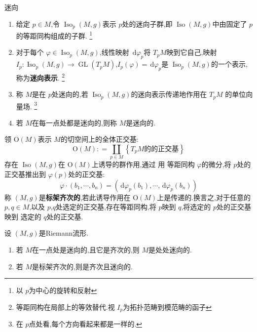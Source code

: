 \documentclass[../../几何与拓扑.tex]{subfiles}
\begin{document}
\begin{definition}{迷向}
    \begin{enumerate}
        \item 给定 \(  p \in M  \),令 \(  \operatorname{Iso} _{p}\left( M,g \right)   \)表示 \(  p  \)处的迷向子群,即 \(  \operatorname{Iso} \left( M,g \right)   \)中由固定了 \(  p  \)的等距同构组成的子群. \footnote{以 \(  p  \)为中心的旋转和反射 }
        \item 对于每个 \(   \varphi  \in \operatorname{Iso} _{p}\left( M,g \right)   \),线性映射 \(  \,\mathrm{d}  \varphi _{p}  \)将 \(  T_{p}M  \)映到它自己,映射 \(  I _{p}: \operatorname{Iso} _{p}\left( M,g \right)\to \operatorname{GL} \left( T_{p}M \right)    \),\(  I _{p}\left(  \varphi  \right)= \,\mathrm{d}  \varphi _{p}   \)是 \(  \operatorname{Iso} _{p}\left( M,g \right)   \)的一个表示,称为\textbf{迷向表示}. \footnote{等距同构在局部上的等效替代.视 \(  I _{p}  \)为拓扑范畴到模范畴的函子 }
        \item 称 \(  M  \)是在 \(  p  \)处迷向的,若 \(  \operatorname{Iso} _{p}\left( M,g \right)   \)的迷向表示传递地作用在 \(  T_{p}M  \)              的单位向量场. \footnote{在 \(  p  \)点处看,每个方向看起来都是一样的. }
        \item 若 \(  M  \)在每一点处都是迷向的,则称 \(  M  \)是迷向的.   
    \end{enumerate}
\end{definition}

\begin{definition}
    领 \(  \mathrm{O}\left( M \right)   \)表示 \(  M  \)的切空间上的全体正交基: \[
    \mathrm{O}\left( M \right): =  \coprod  _{p \in M}\left\{  T_{p}M  的\text{的正交基}\right\} 
    \]  存在 \(  \operatorname{Iso} \left( M,g \right)   \)在 \(  \mathrm{O}\left( M \right)   \)上诱导的群作用,通过 用 等距同构 \(   \varphi   \)的微分,将 \(  p  \)处的正交基推出到 \(  \varphi \left( p \right)   \)处的正交基: \[
     \varphi \cdot \left( b_1,\cdots ,b_{n} \right)= \left( \,\mathrm{d}  \varphi _{p}\left( b_1 \right),\cdots ,\,\mathrm{d}  \varphi _{p}\left( b_{n} \right)   \right)  
    \]
    称 \(  \left( M,g \right)   \)是\textbf{标架齐次的},若此诱导作用在 \(  \mathrm{O}\left( M \right)   \)上是传递的.换言之,对于任意的 \(  p,q \in M  \),以及 \(  p  \),\(  q  \)处选定的正交基,存在等距同构,将 \(  p  \)映到 \(  q  \),将选定的 \(  p  \)处的正交基映到 选定的 \(  q  \)处的正交基.              
\end{definition}

\begin{proposition}
    设 \(  \left( M,g \right)   \)是Riemann流形.
    \begin{enumerate}
        \item 若 \(  M  \)在一点处是迷向的,且它是齐次的,则 \(  M  \)是处处迷向的.
        \item 若 \(  M  \)是标架齐次的,则是齐次且迷向的.   
    \end{enumerate}
     
\end{proposition}
\end{document}
